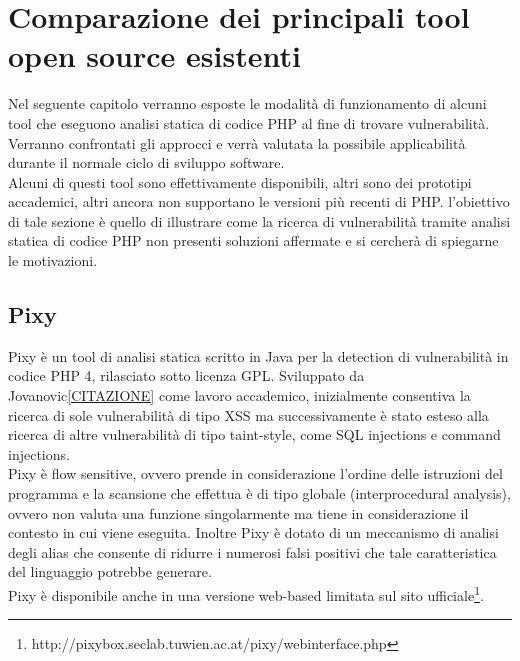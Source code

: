 \chapter{Comparazione dei principali tool open source esistenti}
Nel seguente capitolo verranno esposte le modalità di funzionamento di alcuni tool che eseguono analisi statica di codice PHP al fine di trovare vulnerabilità. Verranno confrontati gli approcci e verrà valutata la possibile applicabilità durante il normale ciclo di sviluppo software. \\
Alcuni di questi tool sono effettivamente disponibili, altri sono dei prototipi accademici, altri ancora non supportano le versioni più recenti di PHP. l'obiettivo di tale sezione è quello di illustrare come la ricerca di vulnerabilità tramite analisi statica di codice PHP non presenti soluzioni affermate e si cercherà di spiegarne le motivazioni.

\section{Pixy}
Pixy è un tool di analisi statica scritto in Java per la detection di vulnerabilità in codice PHP 4, rilasciato sotto licenza GPL. Sviluppato da Jovanovic\ref{CITAZIONE} come lavoro accademico, inizialmente consentiva la ricerca di sole vulnerabilità di tipo XSS ma successivamente è stato esteso alla ricerca di altre vulnerabilità di tipo taint-style, come SQL injections e command injections.\\
Pixy è flow sensitive, ovvero prende in considerazione l'ordine delle istruzioni del programma e la scansione che effettua è di tipo globale (interprocedural analysis), ovvero non valuta una funzione singolarmente ma tiene in considerazione il contesto in cui viene eseguita. Inoltre Pixy è dotato di un meccanismo di analisi degli alias che consente di ridurre i numerosi falsi positivi che tale caratteristica del linguaggio potrebbe generare.\\
Pixy è disponibile anche in una versione web-based limitata sul sito ufficiale\footnote{http://pixybox.seclab.tuwien.ac.at/pixy/webinterface.php}.

